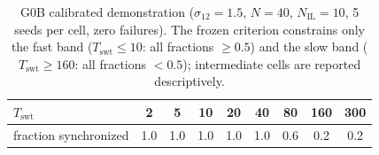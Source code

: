 \begin{table}[t]
\centering
\caption{G0B calibrated demonstration ($\sigma_{12}=1.5$, $N=40$, $N_{\mathrm{IL}}=10$,
5 seeds per cell, zero failures). The frozen criterion constrains only the fast band
($T_{\mathrm{swt}}\leq 10$: all fractions $\geq 0.5$) and the slow band
($T_{\mathrm{swt}}\geq 160$: all fractions $<0.5$); intermediate cells are reported
descriptively.}
\label{tab:g0b}
\small
\begin{tabular}{@{}lcccccccc@{}}
\toprule
$T_{\mathrm{swt}}$ & 2 & 5 & 10 & 20 & 40 & 80 & 160 & 300 \\
\midrule
fraction synchronized & 1.0 & 1.0 & 1.0 & 1.0 & 1.0 & 0.6 & 0.2 & 0.2 \\
\bottomrule
\end{tabular}
\end{table}
